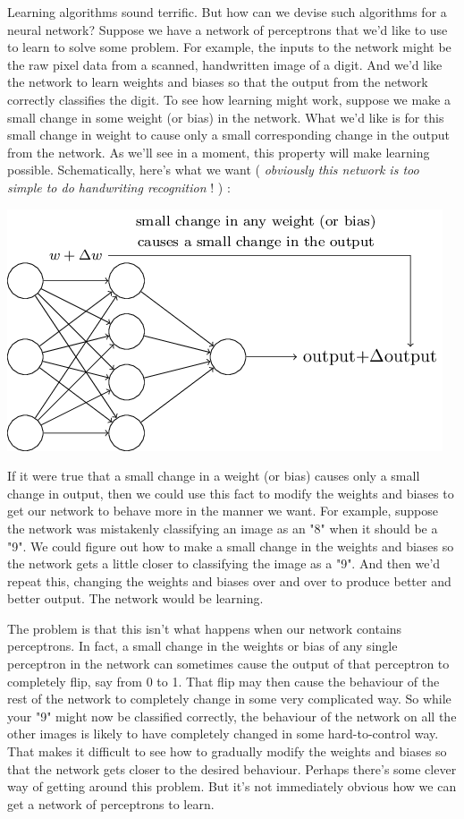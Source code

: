 \documentclass[a4paper,12pt]{report}%
\begin{document}
Learning algorithms sound terrific. But how can we devise such algorithms for a neural network? Suppose we have a network of perceptrons that we'd like to use to learn to solve some problem. For example, the inputs to the network might be the raw pixel data from a scanned, handwritten image of a digit. And we'd like the network to learn weights and biases so that the output from the network correctly classifies the digit. To see how learning might work, suppose we make a small change in some weight (or bias) in the network. What we'd like is for this small change in weight to cause only a small corresponding change in the output from the network. As we'll see in a moment, this property will make learning possible. Schematically, here's what we want ( {\it obviously this network is too simple to do handwriting recognition} ! ) :

\begin{center}
 \includegraphics[width=0.8\linewidth]{images/tikz8.png}
\end{center}

If it were true that a small change in a weight (or bias) causes only a small change in output, then we could use this fact to modify the weights and biases to get our network to behave more in the manner we want. For example, suppose the network was mistakenly classifying an image as an "8" when it should be a "9". We could figure out how to make a small change in the weights and biases so the network gets a little closer to classifying the image as a "9". And then we'd repeat this, changing the weights and biases over and over to produce better and better output. The network would be learning.

The problem is that this isn't what happens when our network contains perceptrons. In fact, a small change in the weights or bias of any single perceptron in the network can sometimes cause the output of that perceptron to completely flip, say from 0 to 1. That flip may then cause the behaviour of the rest of the network to completely change in some very complicated way. So while your "9" might now be classified correctly, the behaviour of the network on all the other images is likely to have completely changed in some hard-to-control way. That makes it difficult to see how to gradually modify the weights and biases so that the network gets closer to the desired behaviour. Perhaps there's some clever way of getting around this problem. But it's not immediately obvious how we can get a network of perceptrons to learn.
\end{document}
